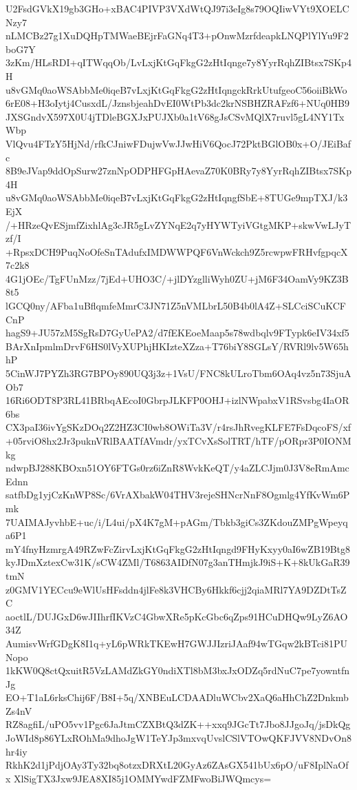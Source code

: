 U2FsdGVkX19gb3GHo+xBAC4PIVP3VXdWtQJ97i3eIg8s79OQIiwVYt9XOELCNzy7
nLMCBz27g1XuDQHpTMWaeBEjrFaGNq4T3+pOnwMzrfdeapkLNQPlYlYu9F2boG7Y
3zKm/HLsRDI+qITWqqOb/LvLxjKtGqFkgG2zHtIqnge7y8YyrRqhZIBtsx7SKp4H
u8vGMq0aoWSAbbMe0iqeB7vLxjKtGqFkgG2zHtIqngckRrkUtufgeoC56oiiBkWo
6rE08+H3oIytj4CusxdL/JznsbjeahDvEI0WtPb3dc2krNSBHZRAFzf6+NUq0HB9
JXSGndvX597X0U4jTDleBGXJxPUJXb0a1tV68gJsCSvMQlX7ruvl5gL4NY1TxWbp
VlQvu4FTzY5HjNd/rfkCJniwFDujwVwJJwHiV6QocJ72PktBGlOB0x+O/JEiBafc
8B9eJVap9ddOpSurw27znNpODPHFGpHAevaZ70K0BRy7y8YyrRqhZIBtsx7SKp4H
u8vGMq0aoWSAbbMe0iqeB7vLxjKtGqFkgG2zHtIqngfSbE+8TUGe9mpTXJ/k3EjX
/+HRzeQvESjmfZixhlAg3cJR5gLvZYNqE2q7yHYWTyiVGtgMKP+skwVwLJyTzf/I
+RpsxDCH9PuqNoOfeSnTAdufxIMDWWPQF6VnWckch9Z5rcwpwFRHvfgpqcX7c2k8
4G1jOEc/TgFUnMzz/7jEd+UHO3C/+jlDYzglliWyh0ZU+jM6F34OamVy9KZ3B8t5
lGCQ0ny/AFba1uBflqmfeMmrC3JN71Z5nVMLbrL50B4b0lA4Z+SLCciSCuKCFCnP
hagS9+JU57zM5SgRsD7GyUePA2/d7fEKEoeMaap5s78wdbqlv9FTypk6eIV34xf5
BArXnIpmlmDrvF6HS0lVyXUPhjHKIzteXZza+T76biY8SGLsY/RVRl9lv5W65hhP
5CinWJ7PYZh3RG7BPOy890UQ3j3z+1VsU/FNC8kULroTbm6OAq4vz5n73SjuAOb7
16Ri6ODT8P3RL41BRbqAEcoI0GbrpJLKFP0OHJ+izlNWpabxV1RSvsbg4IaOR6bs
CX3paI36ivYgSKzDOq2Z2HZ3CI0wb8OWiTa3V/r4rsJhRvegKLFE7FsDqcoFS/xf
+05rviO8hx2Jr3puknVRlBAATfAVmdr/yxTCvXsSolTRT/hTF/pORpr3P0IONMkg
ndwpBJ288KBOxn51OY6FTGs0rz6iZnR8WvkKeQT/y4aZLCJjm0J3V8eRmAmcEdnn
satfbDg1yjCzKnWP8Sc/6VrAXbakW04THV3rejeSHNcrNnF8Ogmlg4YfKvWm6Pmk
7UAIMAJyvhbE+uc/i/L4ui/pX4K7gM+pAGm/Tbkb3giCs3ZKdouZMPgWpeyqa6P1
mY4fnyHzmrgA49RZwFcZirvLxjKtGqFkgG2zHtIqngd9FHyKxyy0aI6wZB19Btg8
kyJDmXztexCw31K/sCW4ZMl/T6863AIDfN07g3anTHmjkJ9iS+K+8kUkGaR39tmN
z0GMV1YECcu9eWlUsHFsddn4jlFe8k3VHCBy6Hkkf6cjj2qiaMRl7YA9DZDtTsZC
aoctlL/DUJGxD6wJIIhrfIKVzC4GbwXRe5pKcGbc6qZps91HCuDHQw9LyZ6AO34Z
AumisvWrfGDgK8I1q+yL6pWRkTKEwH7GWJJIzriJAaf94wTGqw2kBTci81PUNopo
1kKW0Q8ctQxuitR5VzLAMdZkGY0ndiXTl8bM3bxJxODZq5rdNuC7pe7yowntfnJg
EO+T1aL6rksChij6F/B8I+5q/XNBEuLCDAADluWCbv2XaQ6aHhChZ2DnkmbZs4nV
RZ8agfiL/uPO5vv1Pgc6JaJtmCZXBtQ3dZK++xxq9JGcTt7Jbo8JJgoJq/jsDkQg
JoWId8p86YLxROhMa9dhoJgW1TeYJp3mxvqUvslCSlVTOwQKFJVV8NDvOn8hr4iy
RkhK2d1jPdjOAy3Ty32bq8otzxDRXtL20GyAz6ZAsGX541bUx6pO/uF8IplNaOfx
XlSigTX3Jxw9JEA8XI85j1OMMYwdFZMFwoBiJWQmcys=
